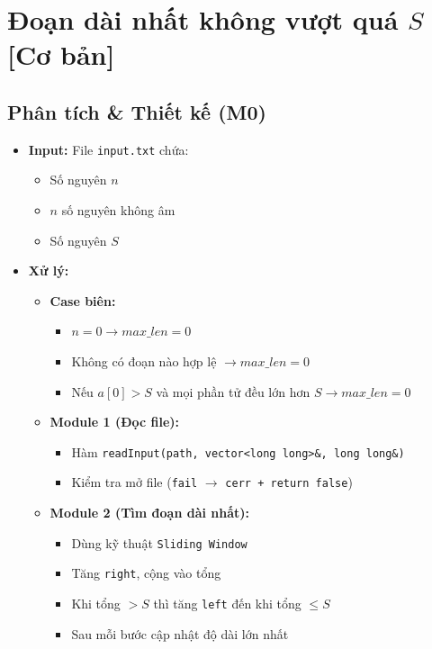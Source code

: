 \section{Đoạn dài nhất không vượt quá $S$ [Cơ bản]}
\subsection{Phân tích \& Thiết kế (M0)}
\begin{itemize}
    \item \textbf{Input:}
    File \texttt{input.txt} chứa:
    \begin{itemize}
        \item Số nguyên $n$
        \item $n$ số nguyên không âm
        \item Số nguyên $S$
    \end{itemize}

    \item \textbf{Xử lý:}
    \begin{itemize}
        \item \textbf{Case biên:}
        \begin{itemize}
            \item $n = 0 \rightarrow max\_len = 0$
            \item Không có đoạn nào hợp lệ $\rightarrow max\_len = 0$
            \item Nếu $a[0] > S$ và mọi phần tử đều lớn hơn $S \rightarrow max\_len = 0$
        \end{itemize}

        \item \textbf{Module 1 (Đọc file):}
        \begin{itemize}
            \item Hàm \texttt{readInput(path, vector<long long>\&, long long\&)}
            \item Kiểm tra mở file (\texttt{fail} $\rightarrow$ \texttt{cerr + return false})
        \end{itemize}

        \item \textbf{Module 2 (Tìm đoạn dài nhất):}
        \begin{itemize}
            \item Dùng kỹ thuật \texttt{Sliding Window}
            \item Tăng \texttt{right}, cộng vào tổng
            \item Khi tổng $> S$ thì tăng \texttt{left} đến khi tổng $\leq S$
            \item Sau mỗi bước cập nhật độ dài lớn nhất
        \end{itemize}


\end{itemize}
\end{itemize}
